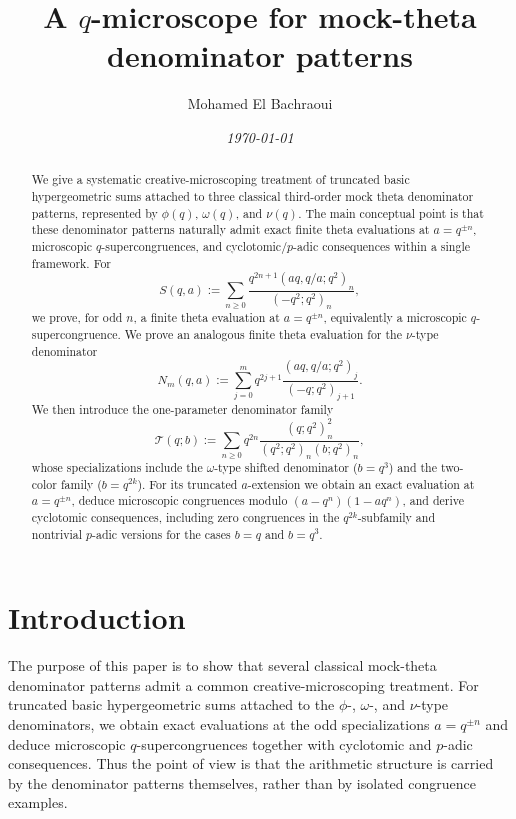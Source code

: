 \documentclass[reqno]{amsart}
\title[A $q$-microscope for mock-theta patterns]{A $q$-microscope for mock-theta denominator patterns}
\theoremstyle{definition}
\theoremstyle{plain}
\theoremstyle{remark}
\newcommand{\T}{\mathcal{T}}
\numberwithin{equation}{section}
\begin{document}
\author[M. El Bachraoui]{Mohamed El Bachraoui}
\address{Dept. Math. Sci,
United Arab Emirates University, PO Box 15551, Al-Ain, UAE}


\begin{abstract}
We give a systematic creative-microscoping treatment of truncated basic hypergeometric sums attached to three classical third-order mock theta denominator patterns, represented by $\phi(q)$, $\omega(q)$, and $\nu(q)$. The main conceptual point is that these denominator patterns naturally admit exact finite theta evaluations at $a=q^{\pm n}$, microscopic $q$-supercongruences, and cyclotomic/$p$-adic consequences within a single framework. For
\[
S(q,a):=\sum_{n\ge 0}\frac{q^{2n+1}(aq,q/a;q^2)_n}{(-q^2;q^2)_n},
\]
we prove, for odd $n$, a finite theta evaluation at $a=q^{\pm n}$, equivalently a microscopic $q$-supercongruence. We prove an analogous finite theta evaluation for the $\nu$-type denominator
\[
N_m(q,a):=\sum_{j=0}^{m} q^{2j+1}\frac{(aq,q/a;q^2)_j}{(-q;q^2)_{j+1}}.
\]
We then introduce the one-parameter denominator family
\[
\T(q;b):=\sum_{n\ge 0} q^{2n}\frac{(q;q^2)_n^2}{(q^2;q^2)_n(b;q^2)_n},
\]
whose specializations include the $\omega$-type shifted denominator ($b=q^3$) and the two-color family ($b=q^{2k}$). For its truncated $a$-extension we obtain an exact evaluation at $a=q^{\pm n}$, deduce microscopic congruences modulo $(a-q^n)(1-aq^n)$, and derive cyclotomic consequences, including zero congruences in the $q^{2k}$-subfamily and nontrivial $p$-adic versions for the cases $b=q$ and $b=q^3$.
\end{abstract}

\date{\textit{\today}}
\maketitle

\section{Introduction}

The purpose of this paper is to show that several classical mock-theta denominator patterns admit a common creative-microscoping treatment. For truncated basic hypergeometric sums attached to the $\phi$-, $\omega$-, and $\nu$-type denominators, we obtain exact evaluations at the odd specializations $a=q^{\pm n}$ and deduce microscopic $q$-supercongruences together with cyclotomic and $p$-adic consequences. Thus the point of view is that the arithmetic structure is carried by the denominator patterns themselves, rather than by isolated congruence examples.
\end{document}
